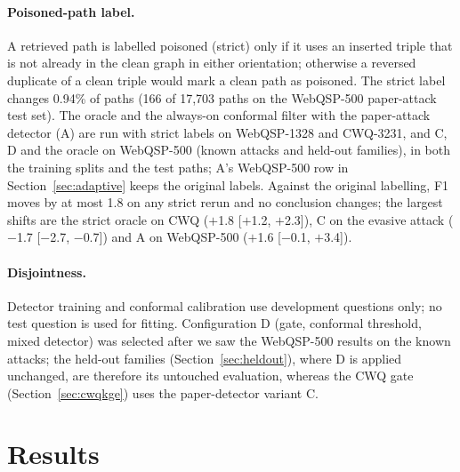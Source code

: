 \documentclass[preprint,12pt]{elsarticle}
\begin{document}
\paragraph{Poisoned-path label.} A retrieved path is labelled poisoned (strict) only if it uses an inserted triple that is not already in the clean graph in either orientation; otherwise a reversed duplicate of a clean triple would mark a clean path as poisoned. The strict label changes 0.94\% of paths (166 of 17,703 paths on the WebQSP-500 paper-attack test set). The oracle and the always-on conformal filter with the paper-attack detector (A) are run with strict labels on WebQSP-1328 and CWQ-3231, and C, D and the oracle on WebQSP-500 (known attacks and held-out families), in both the training splits and the test paths; A's WebQSP-500 row in Section~\ref{sec:adaptive} keeps the original labels. Against the original labelling, F1 moves by at most 1.8 on any strict rerun and no conclusion changes; the largest shifts are the strict oracle on CWQ ($+$1.8 [$+$1.2, $+$2.3]), C on the evasive attack ($-$1.7 [$-$2.7, $-$0.7]) and A on WebQSP-500 ($+$1.6 [$-$0.1, $+$3.4]).

\paragraph{Disjointness.} Detector training and conformal calibration use development questions only; no test question is used for fitting. Configuration D (gate, conformal threshold, mixed detector) was selected after we saw the WebQSP-500 results on the known attacks; the held-out families (Section~\ref{sec:heldout}), where D is applied unchanged, are therefore its untouched evaluation, whereas the CWQ gate (Section~\ref{sec:cwqkge}) uses the paper-detector variant C.

\section{Results}
\end{document}
